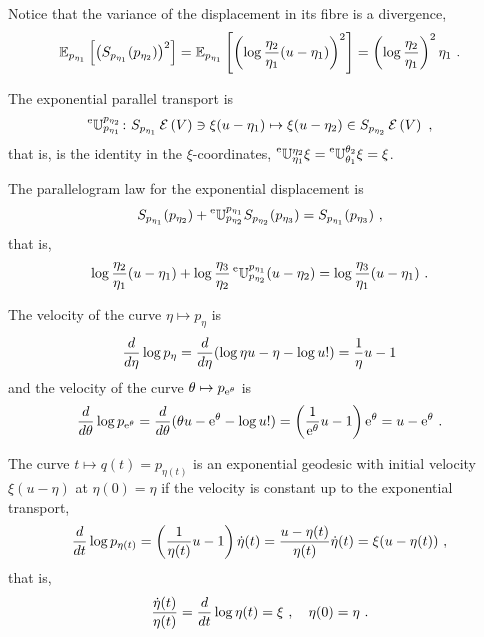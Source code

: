 \documentclass[12pt,a4paper]{amsart}
\theoremstyle{remark}
\begin{document}
Notice that the variance of the displacement in its fibre is a divergence,
\begin{equation}
  \label{eq:22}
  \expectat {p_{\eta_1}} {\left(S_{p_{\eta_1}}(p_{\eta_2})\right)^2} =  \expectat {p_{\eta_1}} {\left(\log \frac {\eta_2}{\eta_1} (u - \eta_1)\right)^2} = \left(\log \frac {\eta_2}{\eta_1}\right)^2 \eta_1 \ .  
\end{equation}

The exponential parallel transport is
\begin{equation}
  \label{eq:10}
  \prescript{\text{e}}{} {\mathbb U} _ {p_{\eta_1}} ^ {p_{\eta_2}} \colon S_{p_{\eta_1}}\operatorname{\mathcal E}\left(V\right) \ni \xi(u - \eta_1) \mapsto \xi(u - \eta_2) \in S_{p_{\eta_2}}\operatorname{\mathcal E}\left(V\right) \ ,
\end{equation}
that is, is the identity in the $\xi$-coordinates, $\prescript{\text{e}}{} {\mathbb U} _ {\eta_1} ^ {\eta_2} \xi = \prescript{\text{e}}{} {\mathbb U} _ {\theta_1} ^ {\theta_2} \xi = \xi$.

The parallelogram law for the exponential displacement is 
\begin{equation}
  \label{eq:11}
  S_{p_{\eta_1}}(p_{\eta_2}) + \prescript{\text{e}}{} {\mathbb U} _ {p_{\eta_2}} ^ {p_{\eta_1}} S_{p_{\eta_2}}(p_{\eta_3}) = S_{p_{\eta_1}}(p_{\eta_3}) \ ,
\end{equation}
that is,
\begin{equation}
  \label{eq:12}
  \log \frac {\eta_2}{\eta_1}(u - \eta_1) + \log \frac {\eta_3}{\eta_2} \prescript{\text{e}}{} {\mathbb U} _ {p_{\eta_2}} ^ {p_{\eta_1}} (u - \eta_2) = \log \frac {\eta_3}{\eta_1}  (u - \eta_1) \ . 
\end{equation}

The velocity of the curve $\eta \mapsto p_\eta$ is
\begin{equation}
  \label{eq:13}
  \frac{d}{d\eta} \log p_\eta = \frac{d}{d\eta} (\log \eta u - \eta - \log u!) = \frac 1 \eta u - 1  
\end{equation}
and the velocity of the curve $\theta \mapsto p_{\mathrm{e}^\theta}$ is 
\begin{equation}
  \label{eq:14}
  \frac{d}{d\theta} \log p_{\mathrm{e}^\theta} = \frac{d}{d\theta} (\theta u - \mathrm{e}^\theta - \log u!) = \left(\frac 1 {\mathrm{e}^\theta} u - 1\right) \mathrm{e}^\theta = u - \mathrm{e}^\theta \ . 
\end{equation}

The curve $t \mapsto q(t) = p_{\eta(t)}$ is an exponential geodesic with initial velocity $\xi (u - \eta)$ at $\eta(0) = \eta$ if the velocity is constant up to the exponential transport,
\begin{equation}
  \label{eq:15}
  \frac{d}{dt} \log p_{\eta(t)} = \left(\frac 1 {\eta(t)} u - 1\right) \dot \eta(t) = \frac {u - \eta(t)} {\eta(t)} \dot \eta(t)=  \xi (u - \eta(t)) \ ,  
\end{equation}
that is,
\begin{equation}
  \label{eq:16}
  \frac {\dot \eta(t)} {\eta(t)} = \frac{d}{dt} \log \eta(t) = \xi \ , \quad  \eta(0) = \eta \ .
\end{equation}
\end{document}
